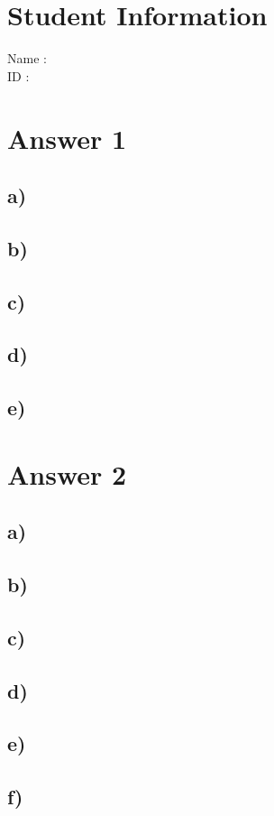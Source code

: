 \documentclass[12pt]{article}
\begin{document}
\section*{Student Information}

Name : \\

ID : \\


\section*{Answer 1}
\subsection*{a)}
\subsection*{b)}
\subsection*{c)}
\subsection*{d)}
\subsection*{e)}

\section*{Answer 2}
\subsection*{a)}
\subsection*{b)}
\subsection*{c)}
\subsection*{d)}
\subsection*{e)}
\subsection*{f)}
\end{document}
